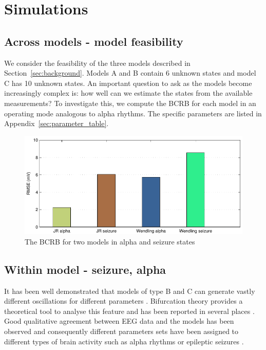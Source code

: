 \documentclass{article}
\begin{document}
\section{Simulations}

\subsection{Across models - model feasibility}

We consider the feasibility of the three models described in Section~\ref{sec:background}. Models A and B contain 6 unknown states and model C has 10 unknown states. An important question to ask as the models become increasingly complex is: how well can we estimate the states from the available measurements? To investigate this, we compute the BCRB for each model in an operating mode analogous to alpha rhythms. The specific parameters are listed in Appendix~\ref{sec:parameter_table}.

\begin{figure}[ht]
  \begin{center}
    \includegraphics{./figures/pdf/AlphaSeizureBar}
  \end{center}
  \caption{The BCRB for two models in alpha and seizure states}
  \label{fig:CrbBar}
\end{figure}



\subsection{Within model - seizure, alpha}

It has been well demonstrated that models of type B and C can generate vastly different oscillations for different parameters \cite{sdf}. Bifurcation theory provides a theoretical tool to analyse this feature and has been reported in several places \cite{sdf}. Good qualitative agreement between EEG data and the models has been observed and consequently different parameters sets have been assigned to different types of brain activity such as alpha rhythms or epileptic seizures \cite{sfd}.
\end{document}
